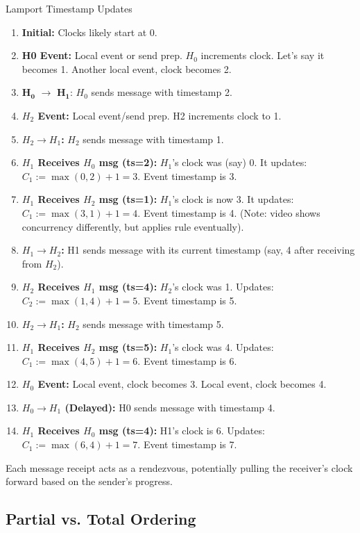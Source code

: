 \begin{example}{Lamport Timestamp Updates}
\begin{enumerate}[label=\roman*), noitemsep]
    \item \textbf{Initial:} Clocks likely start at 0.
    \item \textbf{H0 Event:} Local event or send prep. $H_0$ increments clock. Let's say it becomes 1. Another local event, clock becomes 2.
    \item $\mathbf{H_0}$ $\rightarrow$ $\mathbf{H_1}$: $H_0$ sends message with timestamp 2.
    \item \textbf{$H_2$ Event:} Local event/send prep. H2 increments clock to 1.
    \item \textbf{$H_2 \rightarrow H_1$:} $H_2$ sends message with timestamp 1.
    \item \textbf{$H_1$ Receives $H_0$ msg (ts=2):} $H_1$'s clock was (say) 0. It updates: \( C_1 := \max(0, 2) + 1 = 3 \). Event timestamp is 3.
    \item \textbf{$H_1$ Receives $H_2$ msg (ts=1):} $H_1$'s clock is now 3. It updates: \( C_1 := \max(3, 1) + 1 = 4 \). Event timestamp is 4. (Note: video shows concurrency differently, but applies rule eventually).
    \item \textbf{$H_1 \rightarrow H_2$:} H1 sends message with its current timestamp (say, 4 after receiving from $H_2$).
    \item \textbf{$H_2$ Receives $H_1$ msg (ts=4):} $H_2$'s clock was 1. Updates: \( C_2 := \max(1, 4) + 1 = 5 \). Event timestamp is 5.
    \item \textbf{$H_2 \rightarrow H_1$:} $H_2$ sends message with timestamp 5.
    \item \textbf{$H_1$ Receives $H_2$ msg (ts=5):} $H_1$'s clock was 4. Updates: \( C_1 := \max(4, 5) + 1 = 6 \). Event timestamp is 6.
    \item \textbf{$H_0$ Event:} Local event, clock becomes 3. Local event, clock becomes 4.
    \item \textbf{$H_0 \rightarrow H_1$ (Delayed):} H0 sends message with timestamp 4.
    \item \textbf{$H_1$ Receives $H_0$ msg (ts=4):} H1's clock is 6. Updates: \( C_1 := \max(6, 4) + 1 = 7 \). Event timestamp is 7.
\end{enumerate}
Each message receipt acts as a rendezvous, potentially pulling the receiver's clock forward based on the sender's progress.
\end{example}

\subsection{Partial vs. Total Ordering}

